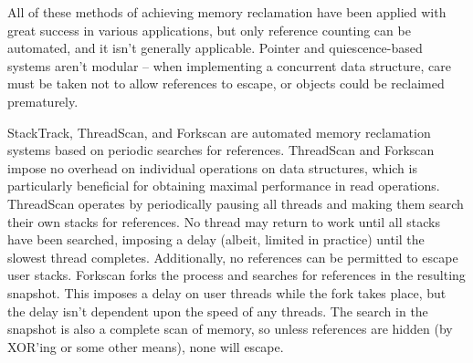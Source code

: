 All of these methods of achieving memory reclamation have been applied with great success in various applications, but only reference counting can be automated, and it isn't generally applicable.  Pointer and quiescence-based systems aren't modular -- when implementing a concurrent data structure, care must be taken not to allow references to escape, or objects could be reclaimed prematurely.

StackTrack\cite{StackTrack}, ThreadScan\cite{Threadscan}, and Forkscan\cite{Forkscan} are automated memory reclamation systems based on periodic searches for references.  ThreadScan and Forkscan impose no overhead on individual operations on data structures, which is particularly beneficial for obtaining maximal performance in read operations.  ThreadScan operates by periodically pausing all threads and making them search their own stacks for references.  No thread may return to work until all stacks have been searched, imposing a delay (albeit, limited in practice) until the slowest thread completes.  Additionally, no references can be permitted to escape user stacks.  Forkscan forks the process and searches for references in the resulting snapshot.  This imposes a delay on user threads while the fork takes place, but the delay isn't dependent upon the speed of any threads.  The search in the snapshot is also a complete scan of memory, so unless references are hidden (by XOR'ing or some other means), none will escape.
